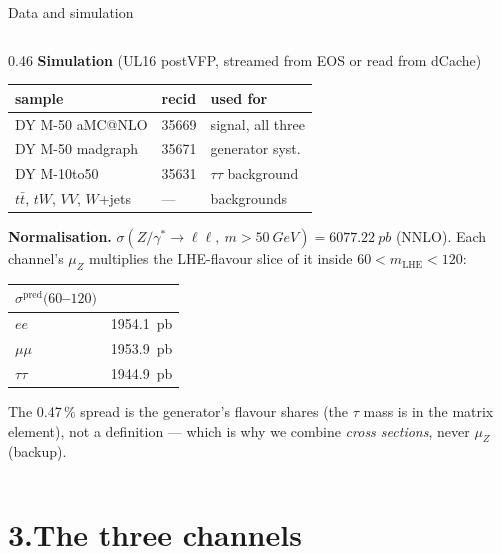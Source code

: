 \documentclass[aspectratio=169,9pt,t]{beamer}
\newcommand{\Z}{\ensuremath{Z/\gamma^{*}}}
\newcommand{\muZ}{\ensuremath{\mu_{Z}}}
\newcommand{\ee}{\ensuremath{ee}}
\begin{document}
\begin{frame}{Data and simulation}
\begin{columns}[T]
\begin{column}{0.46\textwidth}\footnotesize
\textbf{Simulation} (UL16 postVFP, streamed from EOS or read from dCache)
\begin{center}\scriptsize
\begin{tabular}{@{}lll@{}}
\toprule
sample & recid & used for \\ \midrule
DY M-50 aMC@NLO & 35669 & signal, all three \\
DY M-50 madgraph & 35671 & generator syst. \\
DY M-10to50 & 35631 & $\tau\tau$ background \\
$t\bar t$, $tW$, $VV$, $W$+jets & --- & backgrounds \\
\bottomrule
\end{tabular}
\end{center}
\textbf{Normalisation.} $\sigma(\Z\to\ell\ell,\ m > \SI{50}{GeV}) = \SI{6077.22}{pb}$ (NNLO). Each
channel's \muZ{} multiplies the LHE-flavour slice of it inside $60 < m_{\mathrm{LHE}} < 120$:
\begin{center}\scriptsize
\begin{tabular}{@{}lr@{}}
\toprule
$\sigma^{\text{pred}}(60$--$120)$ & \\ \midrule
$\ee$ & \SI{1954.1}{pb} \\
$\mu\mu$ & \SI{1953.9}{pb} \\
$\tau\tau$ & \SI{1944.9}{pb} \\
\bottomrule
\end{tabular}
\end{center}
The 0.47\,\% spread is the generator's flavour shares (the $\tau$ mass is in the matrix element),
not a definition --- which is why we combine \emph{cross sections}, never \muZ{} (backup).
\end{column}
\end{columns}
\end{frame}

\section{3.\quad The three channels}
\end{document}
